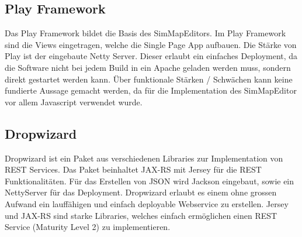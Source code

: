 \subsection*{Play Framework}
Das Play Framework bildet die Basis des SimMapEditors. Im Play Framework sind die Views eingetragen, welche die Single Page App aufbauen. Die Stärke von Play ist der eingebaute Netty Server. Dieser erlaubt ein einfaches Deployment, da die Software nicht bei jedem Build in ein Apache geladen werden muss, sondern direkt gestartet werden kann. Über funktionale Stärken / Schwächen kann keine fundierte Aussage gemacht werden, da für die Implementation des SimMapEditor vor allem Javascript verwendet wurde.
\subsection*{Dropwizard}
Dropwizard ist ein Paket aus verschiedenen Libraries zur Implementation von REST Services. Das Paket beinhaltet JAX-RS mit Jersey für die REST Funktionalitäten. Für das Erstellen von JSON wird Jackson eingebaut, sowie ein NettyServer für das Deployment. Dropwizard erlaubt es einem ohne grossen Aufwand ein lauffähigen und einfach deployable Webservice zu erstellen. Jersey und JAX-RS sind starke Libraries, welches einfach ermöglichen einen REST Service (Maturity Level 2) zu implementieren.
